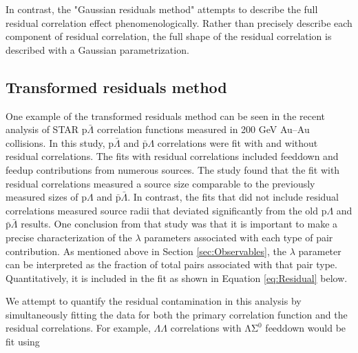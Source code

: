 In contrast, the "Gaussian residuals method" attempts to describe the full residual correlation effect phenomenologically.  
Rather than precisely describe each component of residual correlation, the full shape of the residual correlation is described with a Gaussian parametrization.  


\subsection{Transformed residuals method}
\label{sec:TransformedResiduals}


One example of the transformed residuals method can be seen in the recent analysis \cite{Kisiel:2014mma} of STAR p$\bar{\Lambda}$ correlation functions measured in 200 GeV Au--Au collisions.  
In this study, p$\bar{\Lambda}$ and $\bar{\mathrm{p}}\Lambda$ correlations were fit with and without residual correlations.  
The fits with residual correlations included feeddown and feedup contributions from numerous sources.  
The study found that the fit with residual correlations measured a source size comparable to the previously measured sizes of p$\Lambda$ and $\bar{\mathrm{p}}\bar{\Lambda}$.  
In contrast, the fits that did not include residual correlations measured source radii that deviated significantly from the old p$\Lambda$ and $\bar{\mathrm{p}}\bar{\Lambda}$ results.  
One conclusion from that study was that it is important to make a precise characterization of the $\lambda$ parameters associated with each type of pair contribution.  
As mentioned above in Section \ref{sec:Observables}, the $\lambda$ parameter can be interpreted as the fraction of total pairs associated with that pair type.  
Quantitatively, it is included in the fit as shown in Equation \ref{eq:Residual} below.

We attempt to quantify the residual contamination in this analysis by simultaneously fitting the data for both the primary correlation function and the residual correlations.  
For example, $\Lambda\Lambda$ correlations with $\mathrm{\Lambda\Sigma^0}$ feeddown would be fit using 

